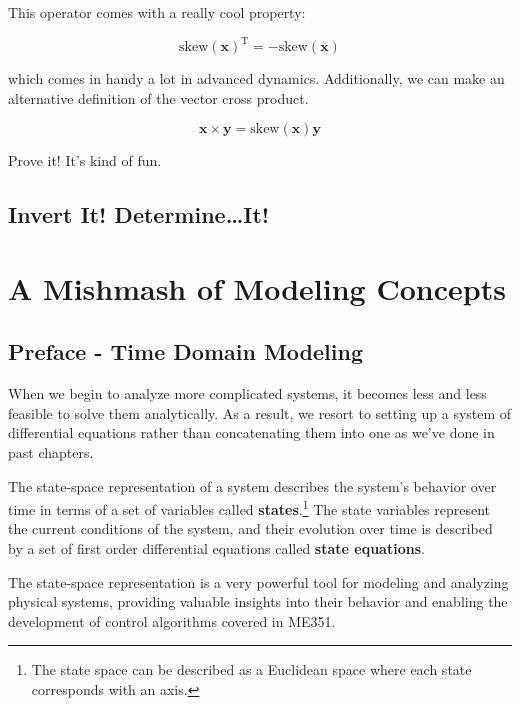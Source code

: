 \documentclass[
  letterpaper,
  DIV=11,
  numbers=noendperiod]{scrreprt}
\begin{document}
This operator comes with a really cool property:

\[\text{skew}(\boldsymbol{x})^\text{T} = -\text{skew}(\boldsymbol{x})\]

which comes in handy a lot in advanced dynamics. Additionally, we can
make an alternative definition of the vector cross product.

\[\boldsymbol{x} \times \boldsymbol{y} = \text{skew}(\boldsymbol{x}) \boldsymbol{y}\]

Prove it! It's kind of fun.

\hypertarget{invert-it-determineit}{%
\section{Invert It! Determine\ldots It!}\label{invert-it-determineit}}


\hypertarget{a-mishmash-of-modeling-concepts}{%
\chapter{A Mishmash of Modeling
Concepts}\label{a-mishmash-of-modeling-concepts}}

\hypertarget{preface---time-domain-modeling}{%
\section*{Preface - Time Domain
Modeling}\label{preface---time-domain-modeling}}


When we begin to analyze more complicated systems, it becomes less and
less feasible to solve them analytically. As a result, we resort to
setting up a system of differential equations rather than concatenating
them into one as we've done in past chapters.

The state-space representation of a system describes the system's
behavior over time in terms of a set of variables called
\textbf{states}.\footnote{The state space can be described as a
  Euclidean space where each state corresponds with an axis.} The state
variables represent the current conditions of the system, and their
evolution over time is described by a set of first order differential
equations called \textbf{state equations}.

The state-space representation is a very powerful tool for modeling and
analyzing physical systems, providing valuable insights into their
behavior and enabling the development of control algorithms covered in
ME351.
\end{document}
